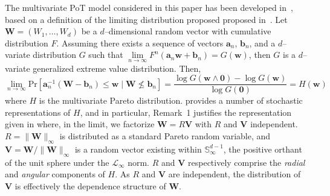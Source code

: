 The multivariate PoT model considered in this paper has been developed 
    in~\cite{trubey2022}, based on a definition of the limiting distribution proposed
    proposed in~\cite{rootzen2018}.  
    Let $\bm{W} = (W_1,\ldots,W_d)$ be a $d$--dimensional random vector with 
    cumulative distribution $F$.  Assuming there exists a sequence of vectors
    $\bm{a}_n$, $\bm{b}_n$, and a $d$--variate distribution $G$ such that 
    $\lim\limits_{n\to\infty}F^n(\bm{a}_n\bm{w} + \bm{b}_n) = G(\bm{w})$, then
    $G$ is a $d$--variate generalized extreme value distribution.  Then,
    \[
        \lim\limits_{n\to\infty}\text{Pr}
            \left[\bm{a}_n^{-1}(\bm{W} - \bm{b}_n) 
                \leq \bm{w}\mid \bm{W}\not\leq \bm{b}_n\right]
        = \frac{\log G(\bm{w}\wedge \bm{0}) - \log G(\bm{w})}{\log G(\bm{0})}
        = H(\bm{w})
    \]
    where $H$ is the multivariate Pareto distribution.  \cite{rootzen2018}
    provides a number of stochastic representations of $H$, and in particular,
    Remark~1 justifies the representation given in \cite{ferreira2014} where,
    in the limit, we factorize $\bm{W} = R\bm{V}$ with $R$ and $\bm{V}$ independent.
    $R = \lVert \bm{W}\rVert_{\infty}$ is distributed as a standard Pareto random
    variable, and $\bm{V} = \bm{W} / \lVert \bm{W}\rVert_{\infty}$ is a random
    vector existing within $\mathbb{S}_{\infty}^{d-1}$, the positive orthant of
    the unit sphere under the $\mathcal{L}_{\infty}$ norm.  $R$ and $\bm{V}$
    respectively comprise the \emph{radial} and \emph{angular} components of $H$.
    As $R$ and $\bm{V}$ are independent,  the distribution of $\bm{V}$ is 
    effectively the dependence structure of $\bm{W}$.

